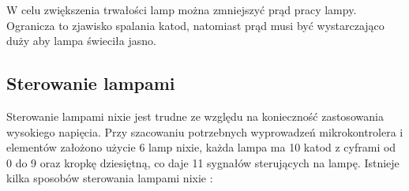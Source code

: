 \documentclass[../main.tex]{subfiles}
\begin{document}
W celu zwiększenia trwałości lamp można zmniejszyć prąd pracy lampy. Ogranicza to
 zjawisko spalania katod, natomiast prąd musi być wystarczająco duży aby lampa świeciła jasno.

\subsection{Sterowanie lampami}
\label{sec:sterownie_lampi}

Sterowanie lampami nixie jest trudne ze względu na konieczność zastosowania wysokiego napięcia.
Przy szacowaniu potrzebnych wyprowadzeń mikrokontrolera i elementów założono użycie 6 lamp nixie, każda lampa ma 10 katod z cyframi od 0 do 9 oraz 
kropkę dziesiętną, co daje 11 sygnałów sterujących na lampę.
Istnieje kilka sposobów sterowania lampami nixie \cite{st:nixie1}:
\end{document}

